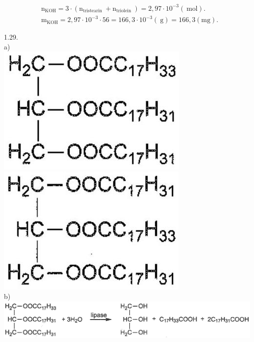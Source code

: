 \documentclass[10pt]{article}
\begin{document}
$$
\begin{aligned}
& \mathrm{n}_{\mathrm{KOH}}=3 \cdot\left(\mathrm{n}_{\text {tristearin }}+\mathrm{n}_{\text {triolein }}\right)=2,97 \cdot 10^{-3}(\mathrm{~mol}) . \\
& \mathrm{m}_{\mathrm{KOH}}=2,97 \cdot 10^{-3} \cdot 56=166,3 \cdot 10^{-3}(\mathrm{~g})=166,3(\mathrm{mg}) .
\end{aligned}
$$

1.29.\\
a)\\
\includegraphics[max width=\textwidth, center]{2025_10_23_b82d44049ffb48e891e8g-02(1)}\\
\includegraphics[max width=\textwidth, center]{2025_10_23_b82d44049ffb48e891e8g-02}\\
b)\\
\includegraphics[max width=\textwidth, center]{2025_10_23_b82d44049ffb48e891e8g-02(3)}\\
\end{document}
